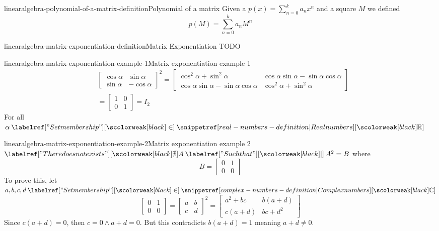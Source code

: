 \documentclass[preview]{standalone}
\begin{document}
\begin{snippetdefinition}{linearalgebra-polynomial-of-a-matrix-definition}{Polynomial of a matrix}
    Given a \polynomial \(p(x)=\sum_{n=0}^k a_nx^n\)
    and a square \matrix \(M\) we defined
    \[
        p(M) = \sum_{n=0}^k a_nM^n
    \]
\end{snippetdefinition}

\begin{snippetdefinition}{linearalgebra-matrix-exponentiation-definition}{Matrix Exponentiation}
    TODO
\end{snippetdefinition}

\begin{snippetexample}{linearalgebra-matrix-exponentiation-example-1}{Matrix exponentiation example 1}
    \begin{align*}
        & {\begin{bmatrix}
            \cos\alpha & \sin\alpha \\
            \sin\alpha & -\cos\alpha
        \end{bmatrix}}^2
        = \begin{bmatrix}
            \cos^2\alpha + \sin^2\alpha & \cos\alpha\sin\alpha - \sin\alpha\cos\alpha \\
            \cos\alpha\sin\alpha - \sin\alpha\cos\alpha & \cos^2\alpha + \sin^2\alpha
        \end{bmatrix}
        \\
        &= \begin{bmatrix}
            1 & 0 \\
            0 & 1
        \end{bmatrix} = I_2
    \end{align*}
    For all \(\alpha \in \realnumbers\)
\end{snippetexample}

\begin{snippetexample}{linearalgebra-matrix-exponentiation-example-2}{Matrix exponentiation example 2}
    \(\nexists A \suchthat A^2 = B\) where
    \[
        B = \begin{bmatrix}
            0 & 1 \\
            0 & 0
        \end{bmatrix}
    \]
    To prove this, let \(a,b,c,d \in \complexnumbers\)
    \[
        \begin{bmatrix}
            0 & 1 \\
            0 & 0
        \end{bmatrix}
        =
        {\begin{bmatrix}
            a & b \\
            c & d
        \end{bmatrix}}^2
        =
        \begin{bmatrix}
            a^2+bc & b(a+d) \\
            c(a+d) & bc+d^2
        \end{bmatrix}
    \]
    Since \(c(a+d)=0\), then \(c=0 \land a+d=0\).
    But this contradicts \(b(a+d)=1\) meaning \(a+d \neq 0\).
\end{snippetexample}
\end{document}
